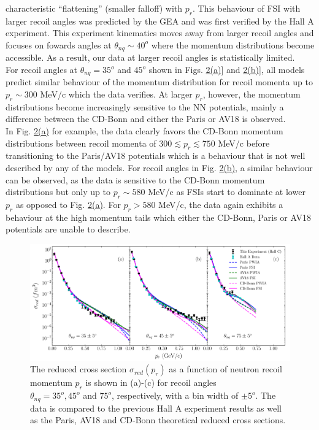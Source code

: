 characteristic ``flattening'' (smaller falloff) with $p_{r}$. This behaviour of FSI with larger recoil angles was predicted by the GEA and was first verified by the Hall A experiment.
This experiment kinematics moves away from larger recoil angles and focuses on fowards angles at $\theta_{nq}\sim 40^{o}$ where the momentum distributions become accessible. As a result, our data at larger recoil angles
is statistically limited. \\
\indent For recoil angles at $\theta_{nq}=35^{o}$ and $45^{o}$ shown in Figs. \hyperref[fig:fig2]{2(a)}] and  \hyperref[fig:fig2]{2(b)}],  all models predict similar behaviour of the momentum distribution for recoil momenta up to $p_{r}\sim$300 MeV/c which the data verifies. At larger $p_{r}$,
however, the momentum distributions become increasingly sensitive to the NN potentials, mainly a difference between the CD-Bonn and either the Paris or AV18 is observed. \\
\indent In Fig. \hyperref[fig:fig2]{2(a)} for example, the data clearly favors the CD-Bonn momentum distributions between recoil momenta of $300\lesssim p_{r}\lesssim750$ MeV/c before transitioning to the Paris/AV18 potentials which is a behaviour that is not well described by any of the models.
For recoil angles in Fig. \hyperref[fig:fig2]{2(b)}, a similar behaviour can be observed, as the data is sensitive to the CD-Bonn momentum distributions but only up to $p_{r}\sim 580$ MeV/c as FSIs start to dominate at lower $p_{r}$
as opposed to Fig. \hyperref[fig:fig2]{2(a)}. For $p_{r}>580$ MeV/c, the data again exhibits a behaviour at the high momentum tails which either the CD-Bonn, Paris or AV18 potentials are unable to describe.
\onecolumngrid

\begin{figure}[bh!]
\includegraphics[scale=0.5]{../prl_plots/PRL_plot1.pdf}
\caption{The reduced cross section $\sigma_{red}(p_{r})$ as a function of neutron recoil momentum $p_{r}$ is shown in (a)-(c) for recoil angles \\  $\theta_{nq}=35^{o}, 45^{o}$ and $75^{o}$, respectively,
with a bin width of $\pm 5^{o}$. The data is compared to the previous Hall A experiment results as well as the Paris, AV18 and CD-Bonn theoretical reduced cross sections.}
\label{fig:fig2}
\end{figure}

